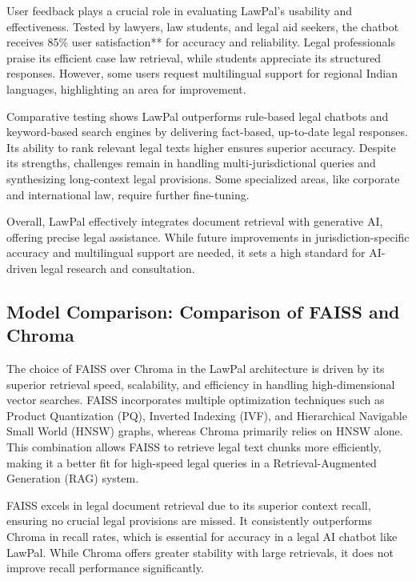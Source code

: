 User feedback plays a crucial role in evaluating LawPal’s usability and effectiveness. Tested by lawyers, law students, and legal aid seekers, the chatbot receives 85\% user satisfaction** for accuracy and reliability. Legal professionals praise its efficient case law retrieval, while students appreciate its structured responses. However, some users request multilingual support for regional Indian languages, highlighting an area for improvement.  

Comparative testing shows LawPal outperforms rule-based legal chatbots and keyword-based search engines by delivering fact-based, up-to-date legal responses. Its ability to rank relevant legal texts higher ensures superior accuracy. Despite its strengths, challenges remain in handling multi-jurisdictional queries and synthesizing long-context legal provisions. Some specialized areas, like corporate and international law, require further fine-tuning.  

Overall, LawPal effectively integrates document retrieval with generative AI, offering precise legal assistance. While future improvements in jurisdiction-specific accuracy and multilingual support are needed, it sets a high standard for AI-driven legal research and consultation.

\subsection{Model Comparison: Comparison of FAISS and Chroma }

The choice of FAISS over Chroma in the LawPal architecture is driven by its superior retrieval speed, scalability, and efficiency in handling high-dimensional vector searches. FAISS incorporates multiple optimization techniques such as Product Quantization (PQ), Inverted Indexing (IVF), and Hierarchical Navigable Small World (HNSW) graphs, whereas Chroma primarily relies on HNSW alone. This combination allows FAISS to retrieve legal text chunks more efficiently, making it a better fit for high-speed legal queries in a Retrieval-Augmented Generation (RAG) system.  

FAISS excels in legal document retrieval due to its superior context recall, ensuring no crucial legal provisions are missed. It consistently outperforms Chroma in recall rates, which is essential for accuracy in a legal AI chatbot like LawPal. While Chroma offers greater stability with large retrievals, it does not improve recall performance significantly.  


